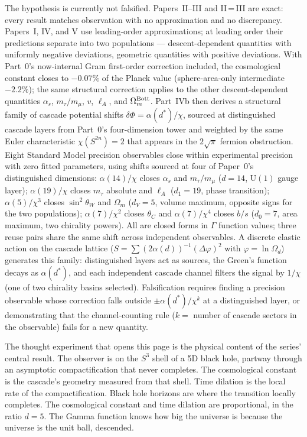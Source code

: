 \documentclass[12pt,a4paper]{article}
\begin{document}
\bigskip

The hypothesis is currently not falsified. Papers~II--III and II\,=\,III
are exact: every result matches observation with no approximation and no
discrepancy. Papers~I, IV, and V use leading-order approximations; at
leading order their predictions separate into two populations --- descent-dependent
quantities with uniformly negative deviations, geometric quantities with
positive deviations. With Part~0's now-internal Gram first-order
correction included, the cosmological constant closes to $-0.07\%$ of
the Planck value (sphere-area-only intermediate $-2.2\%$); the same
structural correction applies to the other descent-dependent quantities
$\alpha_s$, $m_\tau/m_\mu$, $v$, $\ell_A$, and $\Omega_m^{\rm Bott}$. Part~IVb then derives a structural
family of cascade potential shifts $\delta\Phi = \alpha(d^*)/\chi$, sourced at
distinguished cascade layers from Part~0's four-dimension tower and weighted by the
same Euler characteristic $\chi(S^{2n})=2$ that appears in the $2\sqrt{\pi}$ fermion
obstruction. Eight Standard Model precision observables close within experimental
precision with zero fitted parameters, using shifts sourced at four
of Paper~0's distinguished dimensions:
$\alpha(14)/\chi$ closes $\alpha_s$ and $m_\tau/m_\mu$ ($d=14$,
$\mathrm{U}(1)$ gauge layer);
$\alpha(19)/\chi$ closes $m_\tau$ absolute and $\ell_A$ ($d_1=19$,
phase transition);
$\alpha(5)/\chi^3$ closes $\sin^2\theta_W$ and $\Omega_m$ ($d_V=5$,
volume maximum, opposite signs for the two populations);
$\alpha(7)/\chi^2$ closes $\theta_C$ and $\alpha(7)/\chi^4$ closes $b/s$ ($d_0=7$,
area maximum, two chirality powers).
All are closed forms in $\Gamma$ function values; three reuse pairs
share the same shift across independent observables.
A discrete elastic action on the cascade lattice
($S=\sum(2\alpha(d))^{-1}(\Delta\varphi)^2$ with $\varphi=\ln\Omega_d$)
generates this family: distinguished layers act as sources, the Green's
function decays as $\alpha(d^*)$, and each independent cascade channel
filters the signal by $1/\chi$ (one of two chirality basins selected). Falsification requires finding a precision
observable whose correction falls outside $\pm\alpha(d^*)/\chi^k$ at a
distinguished layer, or demonstrating that the channel-counting rule
($k=$ number of cascade sectors in the observable) fails for a new quantity.

\bigskip

The thought experiment that opens this page is the physical content of the series'
central result. The observer is on the $S^3$ shell of a 5D black hole, partway through
an asymptotic compactification that never completes. The cosmological constant is the
cascade's geometry measured from that shell. Time dilation is the local rate of the
compactification. Black hole horizons are where the transition locally completes. The
cosmological constant and time dilation are proportional, in the ratio $d = 5$. The
Gamma function knows how big the universe is because the universe is the unit ball,
descended.
\end{document}
